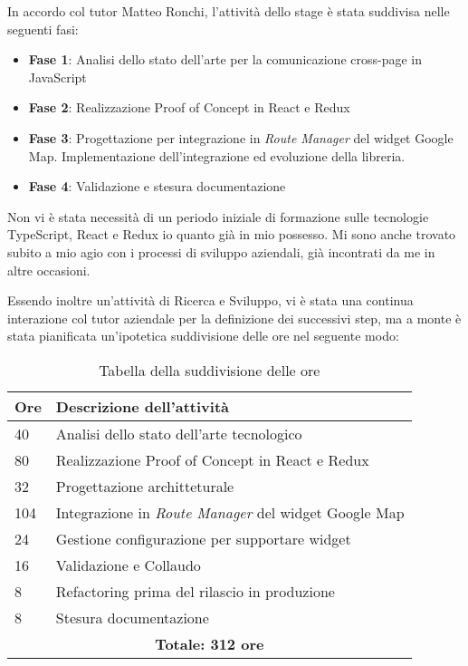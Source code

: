 In accordo col tutor Matteo Ronchi, l'attività dello stage è stata suddivisa nelle seguenti fasi:

\begin{itemize}
    \item \textbf{Fase 1}: Analisi dello stato dell'arte per la comunicazione cross-page in JavaScript
    \item \textbf{Fase 2}: Realizzazione Proof of Concept in React e Redux
    \item \textbf{Fase 3}: Progettazione per integrazione in \textit{Route Manager} del widget Google Map. Implementazione dell'integrazione ed evoluzione della libreria.
    \item \textbf{Fase 4}: Validazione e stesura documentazione
\end{itemize}

Non vi è stata necessità di un periodo iniziale di formazione sulle tecnologie TypeScript, React e Redux io quanto già in mio possesso. Mi sono anche trovato subito a mio agio con i processi di sviluppo aziendali, già incontrati da me in altre occasioni.

Essendo inoltre un'attività di Ricerca e Sviluppo, vi è stata una continua interazione col tutor aziendale per la definizione dei successivi step, ma a monte è stata pianificata un'ipotetica suddivisione delle ore nel seguente modo: \\

\begin{table}[H]
\small
\begin{tabular}{ |p{2cm} |p{10cm}|}
\hline
\textbf{Ore} & \textbf{Descrizione dell'attività} \\ \hline

40 & Analisi dello stato dell'arte tecnologico \\ \hline
80 & Realizzazione Proof of Concept in React e Redux \\ \hline
32 & Progettazione architteturale \\ \hline
104 & Integrazione in \textit{Route Manager} del widget Google Map \\ \hline
24 & Gestione configurazione per supportare widget \\ \hline
16 & Validazione e Collaudo \\ \hline
8 & Refactoring prima del rilascio in produzione \\ \hline
8 & Stesura documentazione \\ \hline

\multicolumn{2}{|c|}{\textbf{Totale: 312 ore}} \\ \hline

\end{tabular}
\caption{Tabella della suddivisione delle ore}
\end{table}

